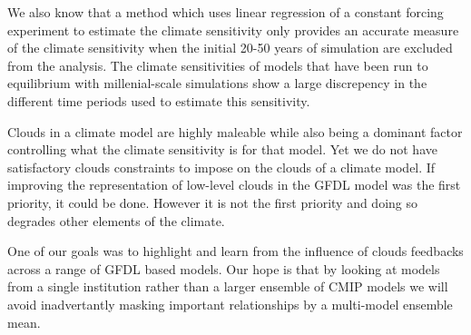 \documentclass[11pt]{article}   	%
\begin{document}
We also know that a method which uses linear regression of a constant forcing experiment to estimate the climate sensitivity only 
provides an accurate measure of the climate sensitivity when the initial 20-50 years of simulation are excluded from the analysis.  
The climate sensitivities of models that have been run to equilibrium with millenial-scale simulations show a large discrepency in the
different time periods used to estimate this sensitivity.  

Clouds in a climate model are highly maleable while also being a dominant factor controlling what the climate sensitivity is for that model.  
Yet we do not have satisfactory clouds constraints to impose on the clouds of a climate model.  If improving the representation of low-level
clouds in the GFDL model was the first priority, it could be done.  However it is not the first priority and doing so degrades other elements of 
the climate.  

One of our goals was to highlight and learn from the influence of clouds feedbacks across a range of GFDL based models.  Our hope 
is that by looking at models from a single institution rather than a larger ensemble of CMIP models we will avoid inadvertantly 
masking important relationships by a multi-model ensemble mean.  
\end{document}

